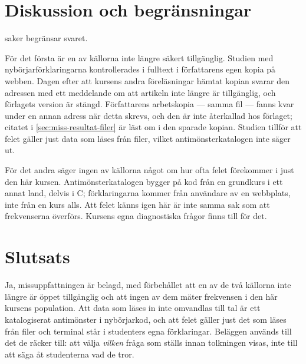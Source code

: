 \section{Diskussion och begränsningar}
\label{sec:miss-diskussion-filer}

 saker begränsar svaret.

För det första är en av källorna inte längre säkert tillgänglig.
Studien med nybörjarförklaringarna kontrollerades i fulltext i
författarens egen kopia på webben.  Dagen efter att kursens andra
föreläsningar hämtat kopian svarar den adressen med ett meddelande om
att artikeln inte längre är tillgänglig, och förlagets version är
stängd.
Författarens arbetskopia --- samma fil --- fanns kvar under en annan
adress när detta skrevs, och den är inte återkallad hos förlaget;
citatet i \cref{sec:miss-resultat-filer} är läst om i den sparade kopian.
Studien tillför att felet gäller just data som läses från filer, vilket
antimönsterkatalogen inte säger ut.

För det andra säger ingen av källorna något om hur ofta felet
förekommer i just den här kursen.  Antimönsterkatalogen bygger på kod från
en grundkurs i ett annat land, delvis i C; förklaringarna kommer från
användare av en webbplats, inte från en kurs alls.  Att felet känns igen
här är inte samma sak som att frekvenserna överförs.  Kursens egna
diagnostiska frågor finns till för det.


\section{Slutsats}
\label{sec:miss-slutsats-filer}

Ja, missuppfattningen är belagd, med förbehållet att en av de två källorna inte
längre är öppet tillgänglig och att ingen av dem mäter frekvensen i den här
kursens population.  Att data som läses in inte omvandlas till tal är ett
katalogiserat antimönster i nybörjarkod\autocite{Bosse2021Antipatterns}, och
att felet gäller just det som läses från filer och terminal står i studenters
egna förklaringar\autocite{GuoMarkelZhang2020}.%
Beläggen används till det de räcker till: att välja \emph{vilken} fråga som
ställs innan tolkningen visas, inte till att säga åt studenterna vad de tror.


